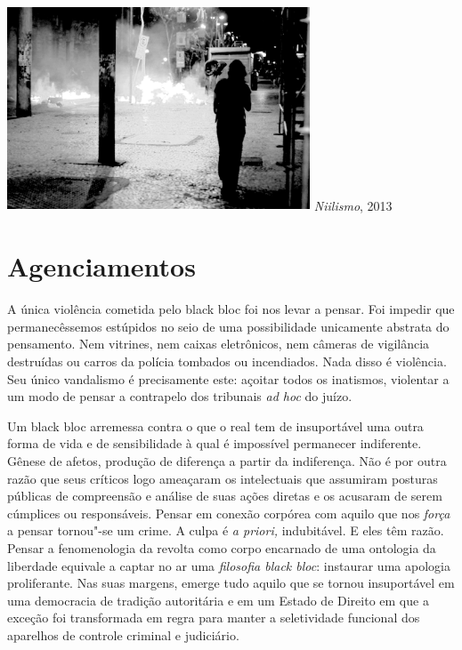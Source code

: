 \begin{center}
\includegraphics[width=9cm,height=6.1cm]{Imgs/img2.jpg}
\emph{Niilismo}, 2013
\end{center}

\section{Agenciamentos}

A única violência cometida pelo black bloc foi
nos levar a pensar. Foi impedir que permanecêssemos estúpidos no seio de
uma possibilidade unicamente abstrata do pensamento. Nem vitrines, nem
caixas eletrônicos, nem câmeras de vigilância destruídas ou carros da
polícia tombados ou incendiados. Nada disso é violência. Seu único
vandalismo é precisamente este: açoitar todos os inatismos, violentar a
um modo de pensar a contrapelo dos tribunais \emph{ad hoc} do juízo.

Um black bloc arremessa contra o que o real tem de insuportável uma
outra forma de vida e de sensibilidade à qual é impossível permanecer
indiferente. Gênese de afetos, produção de diferença a partir da
indiferença. Não é por outra razão que seus críticos logo ameaçaram os
intelectuais que assumiram posturas públicas de compreensão e análise de
suas ações diretas e os acusaram de serem cúmplices ou responsáveis.
Pensar em conexão corpórea com aquilo que nos \emph{força }a pensar
tornou"-se um crime. A culpa é \emph{a priori, }indubitável. E eles têm
razão. Pensar a fenomenologia da revolta como corpo encarnado de uma
ontologia da liberdade equivale a captar no ar uma \emph{filosofia black
bloc}: instaurar uma apologia proliferante. Nas suas margens, emerge
tudo aquilo que se tornou insuportável em uma democracia de tradição
autoritária e em um Estado de Direito em que a exceção foi transformada
em regra para manter a seletividade funcional dos aparelhos de controle
criminal e judiciário.

